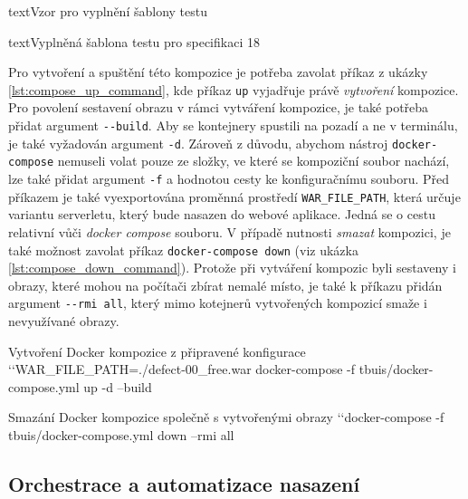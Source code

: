 \documentclass[czech, ma, kiv, he, iso690numb, pdf, viewonly]{fasthesis}
\begin{document}
\begin{code}{text}{Vzor pro vyplnění šablony testu \label{lst:template}}
{\begin{code}{text}{Vyplněná šablona testu pro specifikaci 18 \label{lst:spec18}}
{

    Pro vytvoření a spuštění této kompozice je potřeba zavolat příkaz z ukázky \ref{lst:compose_up_command}, kde příkaz \verb|up| vyjadřuje právě \textit{vytvoření} kompozice. Pro povolení sestavení obrazu v rámci vytváření kompozice, je také potřeba přidat argument \verb|--build|. Aby se kontejnery spustili na pozadí a ne v terminálu, je také vyžadován argument \verb|-d|. Zároveň z důvodu, abychom nástroj \verb|docker-compose| nemuseli volat pouze ze složky, ve které se kompoziční soubor nachází, lze také přidat argument \verb|-f| a hodnotou cesty ke konfiguračnímu souboru. Před příkazem je také vyexportována proměnná prostředí \verb|WAR_FILE_PATH|, která určuje variantu serverletu, který bude nasazen do webové aplikace. Jedná se o cestu relativní vůči \textit{docker compose} souboru. V případě nutnosti \textit{smazat} kompozici, je také možnost zavolat příkaz \verb|docker-compose down| (viz ukázka \ref{lst:compose_down_command}). Protože při vytváření kompozic byli sestaveny i obrazy, které mohou na počítači zbírat nemalé místo, je také k příkazu přidán argument \verb|--rmi all|, který mimo kotejnerů vytvořených kompozicí smaže i nevyužívané obrazy.

    \begin{console}{Vytvoření Docker kompozice z připravené konfigurace \label{lst:compose_up_command}}
`\uxprompt`WAR_FILE_PATH=./defect-00_free.war docker-compose -f tbuis/docker-compose.yml up -d --build
    \end{console}

    \begin{console}{Smazání Docker kompozice společně s vytvořenými obrazy \label{lst:compose_down_command}}
`\uxprompt`docker-compose -f tbuis/docker-compose.yml down --rmi all
    \end{console}

    \subsection{Orchestrace a automatizace nasazení} \label{sec:orchestration}

}
\end{code}}
\end{code}
\end{document}
